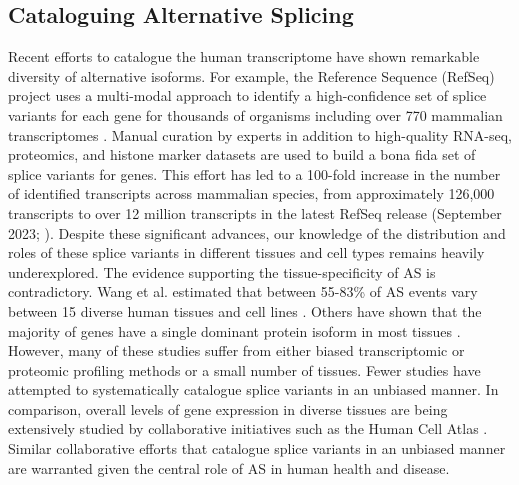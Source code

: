 \subsection{Cataloguing Alternative Splicing}
Recent efforts to catalogue the human transcriptome have shown remarkable diversity of alternative isoforms. For example, the Reference Sequence (RefSeq) project uses a multi-modal approach to identify a high-confidence set of splice variants for each gene for thousands of organisms including over 770 mammalian transcriptomes \cite{OLeary2016-ci}. Manual curation by experts in addition to high-quality RNA-seq, proteomics, and histone marker datasets are used to build a bona fida set of splice variants for genes. This effort has led to a 100-fold increase in the number of identified transcripts across mammalian species, from approximately 126,000 transcripts to over 12 million transcripts in the latest RefSeq release (September 2023; \cite{refseq_ftp}). Despite these significant advances, our knowledge of the distribution and roles of these splice variants in different tissues and cell types remains heavily underexplored. The evidence supporting the tissue-specificity of AS is contradictory. Wang et al. estimated that between 55-83\% of AS events vary between 15 diverse human tissues and cell lines \cite{Wang2008-yg}. Others have shown that the majority of genes have a single dominant protein isoform in most tissues \cite{Ezkurdia2015-iv,Gonzalez-Porta2013-il}. However, many of these studies suffer from either biased transcriptomic or proteomic profiling methods or a small number of tissues. Fewer studies have attempted to systematically catalogue splice variants in an unbiased manner. In comparison, overall levels of gene expression in diverse tissues are being extensively studied by collaborative initiatives such as the Human Cell Atlas \cite{hca_resources}. Similar collaborative efforts that catalogue splice variants in an unbiased manner are warranted given the central role of AS in human health and disease.

